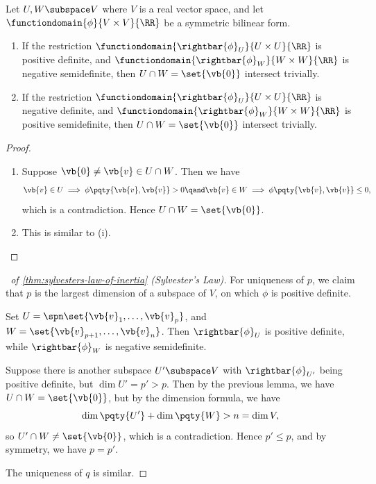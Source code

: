 \begin{lemma}
    Let \(U, W \subspace V\) where \(V\) is a real vector space, and let \(\functiondomain{\phi}{V \times V}{\RR}\) be a symmetric bilinear form.
    \begin{enumerate}[label=(\roman*)]
        \item If the restriction \(\functiondomain{\rightbar{\phi}_{U}}{U \times U}{\RR}\) is positive definite, and \(\functiondomain{\rightbar{\phi}_{W}}{W \times W}{\RR}\) is negative semidefinite, then \(U \cap W = \set{\vb{0}}\) intersect trivially.
        \item If the restriction \(\functiondomain{\rightbar{\phi}_{U}}{U \times U}{\RR}\) is negative definite, and \(\functiondomain{\rightbar{\phi}_{W}}{W \times W}{\RR}\) is positive semidefinite, then \(U \cap W = \set{\vb{0}}\) intersect trivially.
    \end{enumerate}
\end{lemma}

\begin{proof}
    \begin{enumerate}[label=(\roman*)]
        \item Suppose \(\vb{0} \neq \vb{v} \in U \cap W\). Then we have
        \[
            \vb{v} \in U \implies \phi\pqty{\vb{v}, \vb{v}} > 0 \qand \vb{v} \in W \implies \phi\pqty{\vb{v}, \vb{v}} \leq 0,
        \]
        which is a contradiction. Hence \(U \cap W = \set{\vb{0}}\).
        \item This is similar to (i).
    \end{enumerate}
\end{proof}


\begin{proof}[\proofname\ of \autoref{thm:sylvesters-law-of-inertia} (Sylvester's Law)]
    For uniqueness of \(p\), we claim that \(p\) is the largest dimension of a subspace of \(V\), on which \(\phi\) is positive definite.

    Set \(U = \spn \set{\vb{v}_1, \ldots, \vb{v}_p}\), and \(W = \set{\vb{v}_{p + 1}, \ldots, \vb{v}_n}\). Then \(\rightbar{\phi}_U\) is positive definite, while \(\rightbar{\phi}_W\) is negative semidefinite.

    Suppose there is another subspace \(U' \subspace V\) with \(\rightbar{\phi}_{U'}\) being positive definite, but \(\dim U' = p' > p\). Then by the previous lemma, we have \(U \cap W = \set{\vb{0}}\), but by the dimension formula, we have
    \[
        \dim \pqty{U'} + \dim \pqty{W} > n = \dim V,
    \]
    so \(U' \cap W \neq \set{\vb{0}}\), which is a contradiction. Hence \(p' \leq p\), and by symmetry, we have \(p = p'\).

    The uniqueness of \(q\) is similar.
\end{proof}

